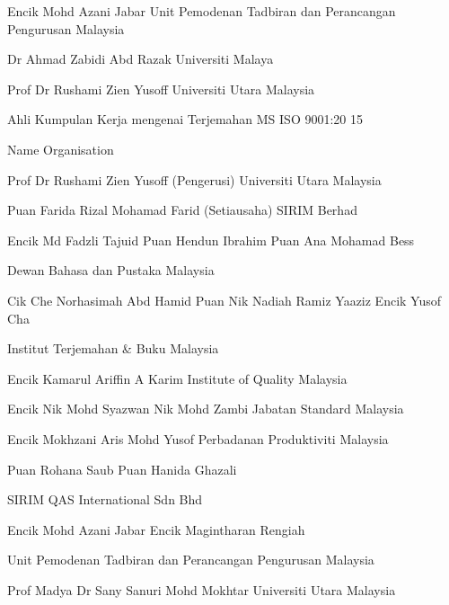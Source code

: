 \documentclass[
]{article}
\begin{document}
Encik Mohd Azani Jabar Unit Pemodenan Tadbiran dan Perancangan
Pengurusan Malaysia

Dr Ahmad Zabidi Abd Razak Universiti Malaya

Prof Dr Rushami Zien Yusoff Universiti Utara Malaysia

Ahli Kumpulan Kerja mengenai Terjemahan MS ISO 9001:20 15

Name Organisation

Prof Dr Rushami Zien Yusoff (Pengerusi) Universiti Utara Malaysia

Puan Farida Rizal Mohamad Farid (Setiausaha) SIRIM Berhad

Encik Md Fadzli Tajuid Puan Hendun Ibrahim Puan Ana Mohamad Bess

Dewan Bahasa dan Pustaka Malaysia

Cik Che Norhasimah Abd Hamid Puan Nik Nadiah Ramiz Yaaziz Encik Yusof
Cha

Institut Terjemahan \& Buku Malaysia

Encik Kamarul Ariffin A Karim Institute of Quality Malaysia

Encik Nik Mohd Syazwan Nik Mohd Zambi Jabatan Standard Malaysia

Encik Mokhzani Aris Mohd Yusof Perbadanan Produktiviti Malaysia

Puan Rohana Saub Puan Hanida Ghazali

SIRIM QAS International Sdn Bhd

Encik Mohd Azani Jabar Encik Magintharan Rengiah

Unit Pemodenan Tadbiran dan Perancangan Pengurusan Malaysia

Prof Madya Dr Sany Sanuri Mohd Mokhtar Universiti Utara Malaysia
\end{document}

